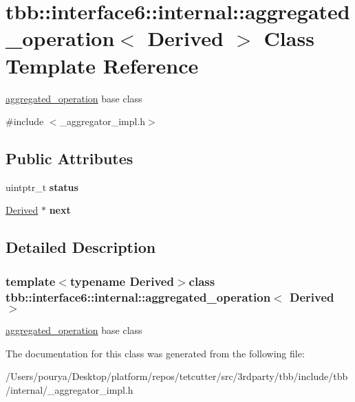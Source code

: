 \hypertarget{classtbb_1_1interface6_1_1internal_1_1aggregated__operation}{}\section{tbb\+:\+:interface6\+:\+:internal\+:\+:aggregated\+\_\+operation$<$ Derived $>$ Class Template Reference}
\label{classtbb_1_1interface6_1_1internal_1_1aggregated__operation}


\hyperlink{classtbb_1_1interface6_1_1internal_1_1aggregated__operation}{aggregated\+\_\+operation} base class  




{\ttfamily \#include $<$\+\_\+aggregator\+\_\+impl.\+h$>$}

\subsection*{Public Attributes}
\begin{DoxyCompactItemize}
\item 
\hypertarget{classtbb_1_1interface6_1_1internal_1_1aggregated__operation_af9cb2284b25a21823d4131150288a70b}{}uintptr\+\_\+t {\bfseries status}\label{classtbb_1_1interface6_1_1internal_1_1aggregated__operation_af9cb2284b25a21823d4131150288a70b}

\item 
\hypertarget{classtbb_1_1interface6_1_1internal_1_1aggregated__operation_a9878d94254cb1a6ec4dc0b3df6b9131c}{}\hyperlink{classDerived}{Derived} $\ast$ {\bfseries next}\label{classtbb_1_1interface6_1_1internal_1_1aggregated__operation_a9878d94254cb1a6ec4dc0b3df6b9131c}

\end{DoxyCompactItemize}


\subsection{Detailed Description}
\subsubsection*{template$<$typename Derived$>$class tbb\+::interface6\+::internal\+::aggregated\+\_\+operation$<$ Derived $>$}

\hyperlink{classtbb_1_1interface6_1_1internal_1_1aggregated__operation}{aggregated\+\_\+operation} base class 

The documentation for this class was generated from the following file\+:\begin{DoxyCompactItemize}
\item 
/\+Users/pourya/\+Desktop/platform/repos/tetcutter/src/3rdparty/tbb/include/tbb/internal/\+\_\+aggregator\+\_\+impl.\+h\end{DoxyCompactItemize}
